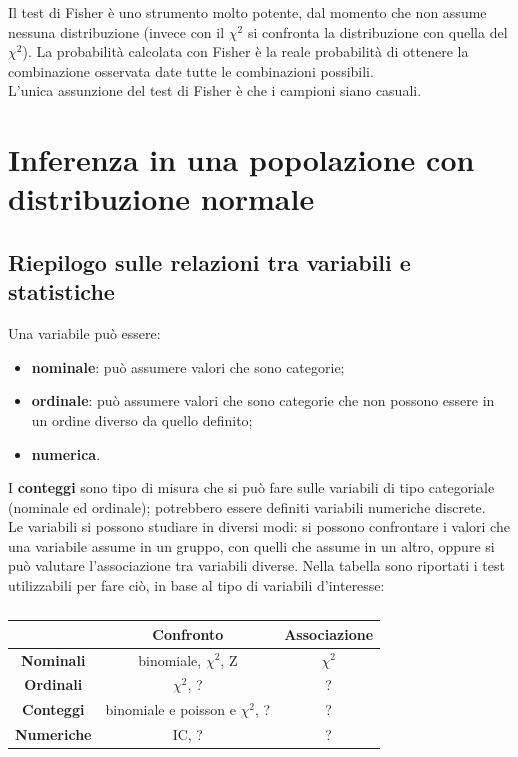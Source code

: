 \documentclass[10pt, draft]{book}
\newcommand{\tightlist}{%
\setlength{\itemsep}{1pt}\setlength{\parskip}{0pt}\setlength{\parsep}{0pt}}
\begin{document}
Il test di Fisher è uno strumento molto potente, dal momento che non assume nessuna distribuzione (invece con il $\chi^2$ si confronta la distribuzione con quella del $\chi^2$). La probabilità calcolata con Fisher è la reale probabilità di ottenere la combinazione osservata date tutte le combinazioni possibili.
\\
L'unica assunzione del test di Fisher è che i campioni siano casuali.

\chapter{Inferenza in una popolazione con distribuzione normale}

\section{Riepilogo sulle relazioni tra variabili e statistiche}
Una variabile può essere:
\begin{itemize} \tightlist
    \item \textbf{nominale}: può assumere valori che sono categorie;
    \item \textbf{ordinale}: può assumere valori che sono categorie che non possono essere in un ordine diverso da quello definito;
    \item \textbf{numerica}.
\end{itemize}
I \textbf{conteggi} sono tipo di misura che si può fare sulle variabili di tipo categoriale (nominale ed ordinale); potrebbero essere definiti variabili numeriche discrete.
\\
Le variabili si possono studiare in diversi modi: si possono confrontare i valori che una variabile assume in un gruppo, con quelli che assume in un altro, oppure si può valutare l'associazione tra variabili diverse.
Nella tabella sono riportati i test utilizzabili per fare ciò, in base al tipo di variabili d'interesse:
\begin{table}[H]
    \centering
    \renewcommand\arraystretch{1.2}
    \begin{tabular}{c|c|c}
    \hline
    & \textbf{Confronto} & \textbf{Associazione}\\
    \hline
    \textbf{Nominali} & binomiale, $\chi^2$, Z & $\chi^2$\\
    \hline
    \textbf{Ordinali} & $\chi^2$, ? & ?\\
    \hline
    \textbf{Conteggi} & binomiale e poisson e $\chi^2$, ? & ?\\
    \hline
    \textbf{Numeriche} & IC, ? & ?\\
    \hline
    \end{tabular}
    \caption{\small{}}
    \label{tabstrumentivariabili}
\end{table}\noindent
\end{document}
